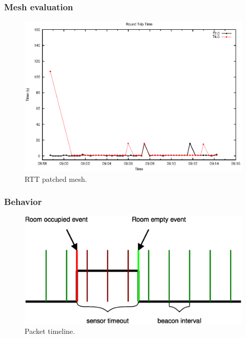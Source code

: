 \documentclass{beamer}
\begin{document}
\begin{frame}
\frametitle{Mesh evaluation}
	
	\begin{center}
		\begin{figure}
			\includegraphics[width=\textwidth]{plot_patched.eps}
			\caption{RTT patched mesh.}
		\end{figure}
	\end{center}
	
\end{frame}

\begin{frame}
\frametitle{Behavior}

	\begin{center}
		\begin{figure}
			\includegraphics[width=\textwidth]{sensor.eps}
			\caption{Packet timeline.}
		\end{figure}
	\end{center}

\end{frame}
\end{document}
